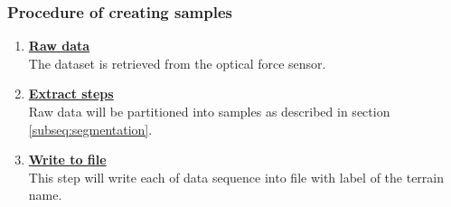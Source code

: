 \documentclass[USenglish]{ifimaster}  %
\begin{document}
\subsubsection{Procedure of creating samples} \label{sub:createsamples}
\begin{enumerate}
	\item \textbf{\underline{Raw data}}
	\\
	The dataset is retrieved from the optical force sensor.
	
	\item \textbf{\underline{Extract steps}}
	\\
	Raw data will be partitioned into samples as described in section \ref{subseq:segmentation}.
	
	\item \textbf{\underline{Write to file}}
	\\
	This step will write each of data sequence into file with label of the terrain name.
	

\end{enumerate}
\end{document}
